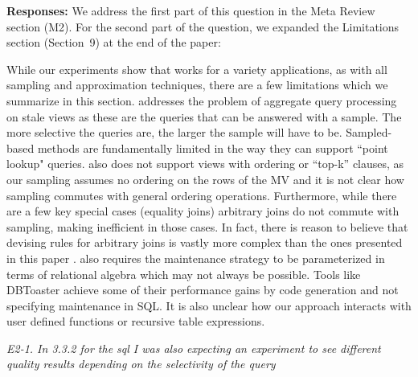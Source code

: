 {\bf Responses:} We address the first part of this question in the Meta Review section (M2). For the second part of the question, we expanded the Limitations section (Section~9) at the end of the paper:
\begin{displayquote}
While our experiments show that \svc works for a variety applications, as with all sampling and approximation techniques, there are a few limitations which we summarize in this section.
\svc addresses the problem of aggregate query processing on stale views as these are the queries that can be answered with a sample.
The more selective the queries are, the larger the sample will have to be.
Sampled-based methods are fundamentally limited in the way they can support ``point lookup" queries.
\svc also does not support views with ordering or ``top-k'' clauses, as our sampling assumes no ordering on the rows of the MV and it is not clear how sampling commutes with general ordering operations.
Furthermore, while there are a few key special cases (equality joins) arbitrary joins do not commute with sampling, making \svc inefficient in those cases.
In fact, there is reason to believe that devising rules for arbitrary joins is vastly more complex than the ones presented in this paper \cite{DBLP:journals/pvldb/NirkhiwaleDJ13}.
\svc also requires the maintenance strategy to be parameterized in terms of relational algebra which may not always be possible.
Tools like DBToaster achieve some of their performance gains by code generation and not specifying maintenance in SQL.
It is also unclear how our approach interacts with user defined functions or recursive table expressions. 
\end{displayquote}

\emph{E2-1. In 3.3.2 for the sql I was also expecting an experiment to see different quality results depending on the selectivity of the query}

\vspace{.25em}

